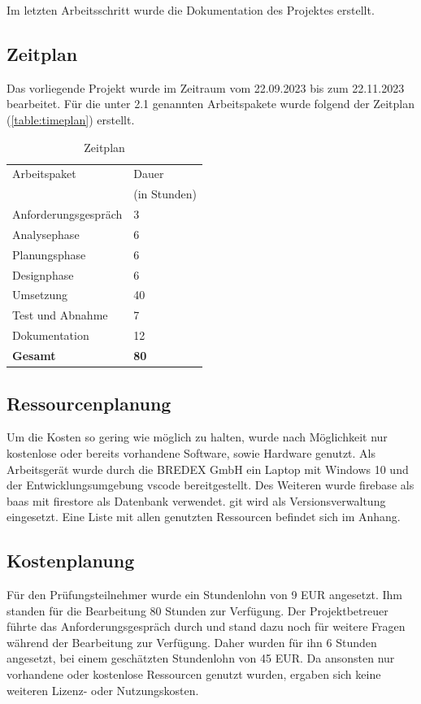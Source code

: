 \documentclass[11pt]{article}
\begin{document}
Im letzten Arbeitsschritt wurde die Dokumentation des Projektes erstellt. 

\subsection{Zeitplan}
Das vorliegende Projekt wurde im Zeitraum vom 22.09.2023 bis zum 22.11.2023 bearbeitet. 
Für die unter 2.1 genannten Arbeitspakete wurde folgend der Zeitplan 
(\autoref{table:timeplan}) erstellt. 

\begin{table}[H]
    \centering
    \begin{tabular}{|l | l|}
        \hline
        Arbeitspaket & Dauer \\
        & (in Stunden) \\
        \hline
        Anforderungsgespräch & 3 \\
        Analysephase & 6 \\
        Planungsphase & 6 \\
        Designphase & 6 \\
        Umsetzung & 40 \\
        Test und Abnahme & 7 \\
        Dokumentation & 12 \\
        \hline
        \textbf{Gesamt} & \textbf{80} \\
        \hline
    \end{tabular}
    \caption{Zeitplan}
    \label{table:timeplan}
\end{table}

\subsection{Ressourcenplanung}
Um die Kosten so gering wie möglich zu halten, wurde nach Möglichkeit nur
kostenlose oder bereits vorhandene Software, sowie Hardware genutzt.
Als Arbeitsgerät wurde durch die BREDEX GmbH ein Laptop mit Windows 10 und der
Entwicklungsumgebung \gls{vscode} bereitgestellt.
Des Weiteren wurde \gls{firebase} als \gls*{baas} mit \gls{firestore} als Datenbank verwendet. \Gls{git} wird als 
Versionsverwaltung eingesetzt.\newline
Eine Liste mit allen genutzten Ressourcen befindet sich im Anhang. 

\subsection{Kostenplanung}
Für den Prüfungsteilnehmer wurde ein Stundenlohn von 9 EUR angesetzt. %
Ihm standen für die Bearbeitung 80 Stunden zur Verfügung.
Der Projektbetreuer führte das Anforderungsgespräch durch und stand 
dazu noch für weitere Fragen während der Bearbeitung zur Verfügung.
Daher wurden für ihn 6 Stunden angesetzt, bei einem geschätzten 
Stundenlohn von 45 EUR.
Da ansonsten nur vorhandene oder kostenlose Ressourcen genutzt wurden,
ergaben sich keine weiteren Lizenz- oder Nutzungskosten.
\end{document}
